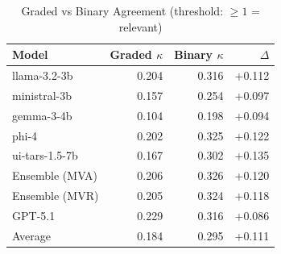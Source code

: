 \begin{table}[htbp]
\centering
\caption{Graded vs Binary Agreement (threshold: $\geq 1$ = relevant)}
\label{tab:binary-agreement-comparison}
\begin{tabular}{lrrr}
\toprule
Model & Graded $\kappa$ & Binary $\kappa$ & $\Delta$ \\
\midrule
llama-3.2-3b & 0.204 & 0.316 & +0.112 \\
ministral-3b & 0.157 & 0.254 & +0.097 \\
gemma-3-4b & 0.104 & 0.198 & +0.094 \\
phi-4 & 0.202 & 0.325 & +0.122 \\
ui-tars-1.5-7b & 0.167 & 0.302 & +0.135 \\
Ensemble (MVA) & 0.206 & 0.326 & +0.120 \\
Ensemble (MVR) & 0.205 & 0.324 & +0.118 \\
GPT-5.1 & 0.229 & 0.316 & +0.086 \\
\midrule
Average & 0.184 & 0.295 & +0.111 \\
\bottomrule
\end{tabular}
\end{table}